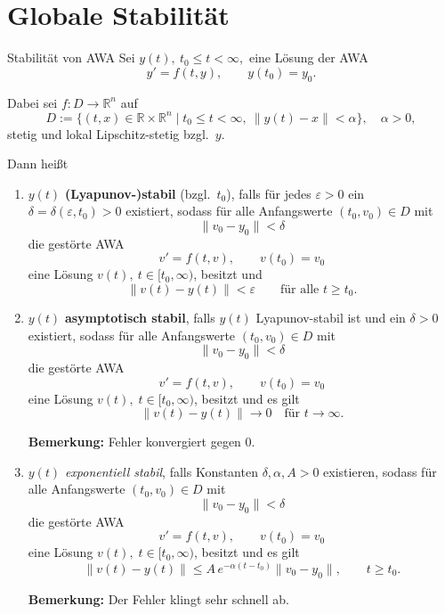 \newpage
\section{Globale Stabilität}
\label{5.4}

\begin{definition}{Stabilität von AWA}
    Sei $y(t),\ t_0 \le t < \infty,$ eine Lösung der AWA
    $$
    y' = f(t,y),\qquad y(t_0)=y_0.
    $$

    Dabei sei $f: D \to \mathbb{R}^n$ auf
    $$
    D := \{(t,x)\in\mathbb{R}\times\mathbb{R}^n \mid t_0 \le t < \infty,\ \|{y(t)-x}\|<\alpha\},\quad \alpha>0,
    $$
    stetig und lokal Lipschitz-stetig bzgl.\ $y$.
    
    Dann heißt
    \begin{enumerate}
        \item $y(t)$ \textbf{(Lyapunov-)stabil} (bzgl.\ $t_0$), falls für jedes $\varepsilon>0$ ein $\delta=\delta(\varepsilon,t_0)>0$ existiert, sodass für alle Anfangswerte $(t_0,v_0)\in D$ mit
            $$
            \|v_0-y_0\|<\delta
            $$
            die gestörte AWA
            $$
            v' = f(t,v),\qquad v(t_0)=v_0
            $$
            eine Lösung $v(t),\ t\in[t_0,\infty)$, besitzt und
            $$
            \|v(t)-y(t)\|<\varepsilon\qquad\text{für alle }t\ge t_0.
            $$  

        \item $y(t)$ \textbf{asymptotisch stabil}, falls $y(t)$ Lyapunov-stabil ist und ein $\delta>0$ existiert, sodass für alle Anfangswerte $(t_0,v_0)\in D$ mit
            $$
            \|v_0-y_0\|<\delta
            $$
            die gestörte AWA
            $$
            v' = f(t,v),\qquad v(t_0)=v_0
            $$
            eine Lösung $v(t),\; t\in[t_0,\infty)$, besitzt und es gilt
            $$
            \|v(t)-y(t)\|\to 0\quad\text{für }t\to\infty.
            $$

            \textbf{Bemerkung:} Fehler konvergiert gegen 0.  
        
        \item $y(t)$ \emph{exponentiell stabil}, falls Konstanten $\delta,\alpha,A>0$ existieren, sodass für alle Anfangswerte $(t_0,v_0)\in D$ mit
            $$
            \lVert v_0-y_0\rVert < \delta
            $$
            die gestörte AWA
            $$
            v' = f(t,v),\qquad v(t_0)=v_0
            $$
            eine Lösung $v(t),\; t\in[t_0,\infty)$, besitzt und es gilt
            $$
            \lVert v(t)-y(t)\rVert \le A\,e^{-\alpha (t-t_0)}\lVert v_0-y_0\rVert,\qquad t\ge t_0.
            $$

            \textbf{Bemerkung:} Der Fehler klingt sehr schnell ab. 
    \end{enumerate}
\end{definition}

